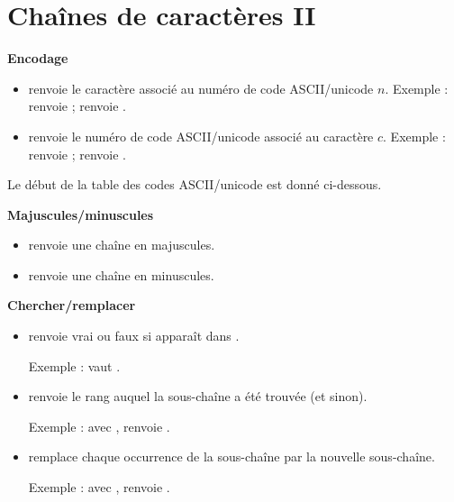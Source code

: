 \documentclass[11pt,class=report,crop=false]{standalone}
\begin{document}
\section{Chaînes de caractères II}



\textbf{Encodage}

\begin{itemize}
  \item {} \quad renvoie le caractère associé au numéro de code ASCII/unicode $n$. Exemple :  renvoie  ;  renvoie .
    
  \item {} \quad renvoie le numéro de code ASCII/unicode associé au caractère $c$. Exemple :  renvoie  ;  renvoie .
\end{itemize}

Le début de la table des codes ASCII/unicode est donné ci-dessous.


\bigskip

\textbf{Majuscules/minuscules}

\begin{itemize}
  \item {} renvoie une chaîne en majuscules.
  \item {} renvoie une chaîne en minuscules.  
\end{itemize}

\bigskip

\textbf{Chercher/remplacer}

\begin{itemize}
  \item {} \quad renvoie \og{}vrai\fg{} ou \og{}faux\fg{} si  apparaît dans .
  
   Exemple :
 vaut .

  \item  {} \quad renvoie le rang auquel  la sous-chaîne a été trouvée (et  sinon).
  
  Exemple : avec ,  renvoie  .
  
   \item  {} \quad remplace 
   chaque occurrence de la sous-chaîne par la nouvelle sous-chaîne.
   
   Exemple : avec ,  renvoie
   .

\end{itemize}
\end{document}
